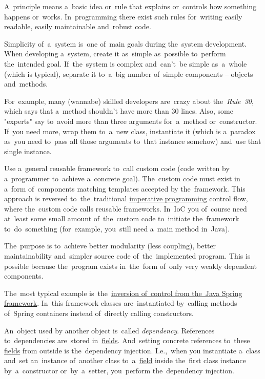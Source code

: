 A~principle means a~basic idea or~rule that explains or~controls how something happens or~works.
In~programming there exist such rules for~writing easily readable, easily maintainable and~robust code.

Simplicity of~a~system is~one of~main goals during the~system development.
When developing a~system, create it as~simple as~possible to~perform the~intended goal.
If~the~system is complex and~can't~be simple as~a~whole (which is typical), separate it to~a~big number of~simple components -- objects and~methods.

For~example, many (wannabe) skilled developers are~crazy about the~\textit{Rule~30}, which says that a~method shouldn't have more than 30 lines.
Also, some "experts" say to~avoid more than three arguments for~a~method or~constructor.
If~you need more, wrap them to~a~new class, instantiate it (which is a~paradox as~you need to~pass all those arguments to~that instance somehow) and~use that single instance.

\label{inversionofcontrol}
Use a~general reusable framework to~call custom code (code written by a~programmer to~achieve a~concrete goal).
The~custom code must exist in a~form of~components matching templates accepted by the~framework.
This approach is reversed to~the~traditional \hyperref[imperativeprogramming]{imperative programming} control flow, where the~custom code calls reusable frameworks.
In~IoC you of~course need at~least some small amount of~the~custom code to~initiate the~framework to~do~something (for~example, you~still need a~main method in~Java).

The~purpose is to~achieve better modularity (less coupling), better maintainability and~simpler source code of~the~implemented program.
This is possible because the~program exists in~the~form of~only very weakly dependent components.

The~most typical example is~the~\hyperref[springinversionofcontrol]{inversion of~control from the~Java Spring framework}.
In~this framework classes are~instantiated by~calling methods of~Spring containers instead of~directly calling constructors.

\label{dependencyinjection}
An~object used by another object is~called \textit{dependency}.
References to~dependencies are~stored in~\hyperref[variablefieldproperty]{fields}.
And~setting concrete references to~these \hyperref[variablefieldproperty]{fields} from outside is the~dependency injection.
I.e.,~when you instantiate a~class and~set an~instance of~another class to~a~\hyperref[variablefieldproperty]{field} inside the~first class instance by~a~constructor or~by~a~setter, you~perform the~dependency injection.

